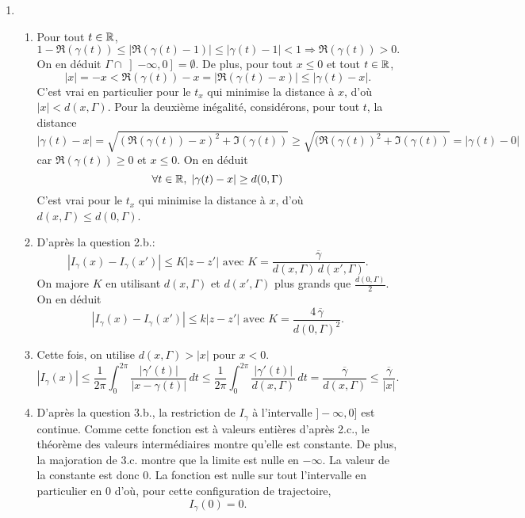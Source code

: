 \begin{enumerate}
\begin{enumerate}
\end{enumerate}

 \item
\begin{enumerate}
 \item Pour tout $t\in \mathbb{R}$,
\[
1 - \Re(\gamma(t)) \leq \left|\Re(\gamma(t) - 1)\right|\leq \left| \gamma(t) -1 \right| < 1 \Rightarrow \Re(\gamma(t)) > 0.
\]
On en déduit $\Gamma \cap \left] -\infty , 0 \right] = \emptyset$. De plus, pour tout $x\leq 0$ et tout $t\in \mathbb{R}$,
\[
 |x| = -x < \Re(\gamma(t)) -x = \left| \Re(\gamma(t) -x)\right| \leq \left| \gamma(t) - x \right|. 
\]
C'est vrai en particulier pour le $t_x$ qui minimise la distance à $x$, d'où $|x| < d(x,\Gamma)$.\newline
Pour la deuxième inégalité, considérons, pour tout $t$, la distance 
\[
 \left|\gamma(t) -x\right| = \sqrt{(\Re(\gamma(t)) -x)^2 + \Im(\gamma(t))}
 \geq \sqrt{(\Re(\gamma(t))^2 + \Im(\gamma(t))} = |\gamma(t) - 0|
\]
car $\Re(\gamma(t))\geq 0$ et $x\leq 0$. On en déduit
\[
 \forall t \in \mathbb{R}, \; \left|\gamma(t) -x\right| \geq d(0,\Gamma)
\]
C'est vrai pour le $t_x$ qui minimise la distance à $x$, d'où $ d(x,\Gamma) \leq d(0,\Gamma)$.

 \item D'après la question 2.b.:
\[
 \left| I_\gamma(x) - I_\gamma(x')\right| \leq K \left| z - z' \right| \text{ avec } K = \frac{\overline{\gamma}}{d(x,\Gamma)\,d(x',\Gamma)}.
\]
On majore $K$ en utilisant $d(x,\Gamma)$ et $d(x',\Gamma)$ plus grands que $\frac{d(0,\Gamma)}{2}$. On en déduit 
\[
 \left| I_\gamma(x) - I_\gamma(x')\right| \leq k \left| z - z' \right| \text{ avec } K = \frac{4\,\overline{\gamma}}{d(0,\Gamma)^2}.
\]

 \item Cette fois, on utilise $d(x,\Gamma)> |x|$ pour $x < 0$.
\[
 \left| I_\gamma(x) \right| \leq \frac{1}{2\pi}\int_0^{2\pi}\frac{|\gamma'(t)|}{\left|x - \gamma(t)\right|}\, dt
 \leq \frac{1}{2\pi}\int_0^{2\pi}\frac{|\gamma'(t)|}{d(x,\Gamma)}\, dt = \frac{\overline{\gamma}}{d(x,\Gamma)} \leq \frac{\overline{\gamma}}{|x|}.
\]

 \item D'après la question 3.b., la restriction de $I_\gamma$ à l'intervalle $]-\infty, 0 ]$ est continue. Comme cette fonction est à valeurs entières d'après 2.c., le théorème des valeurs intermédiaires montre qu'elle est constante. De plus, la majoration de 3.c. montre que la limite est nulle en $-\infty$. La valeur de la constante est donc $0$. La fonction est nulle sur tout l'intervalle en particulier en $0$ d'où, pour cette configuration de trajectoire,
 \[
  I_\gamma(0) = 0.
 \]

\end{enumerate}
\end{enumerate}


